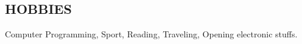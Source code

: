 \documentclass[margin]{res}
\begin{document}
\begin{resume}


\section{HOBBIES}
Computer Programming, Sport, Reading, Traveling, Opening electronic stuffs. 
\end{resume}
\end{document}
